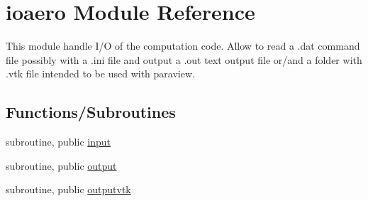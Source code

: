 \hypertarget{namespaceioaero}{}\section{ioaero Module Reference}
\label{namespaceioaero}


This module handle I/O of the computation code. Allow to read a .dat command file possibly with a .ini file and output a .out text output file or/and a folder with .vtk file intended to be used with paraview.  


\subsection*{Functions/\+Subroutines}
\begin{DoxyCompactItemize}
\item 
subroutine, public \hyperlink{namespaceioaero_a039bc1aae10012ce8e368bc202bb81be}{input}
\item 
subroutine, public \hyperlink{namespaceioaero_a1f2f8f2b4f6e233d2753c1fd1809a44a}{output}
\item 
subroutine, public \hyperlink{namespaceioaero_a7eb68cb1588d24e05c8f056ca107e163}{outputvtk}
\end{DoxyCompactItemize}
